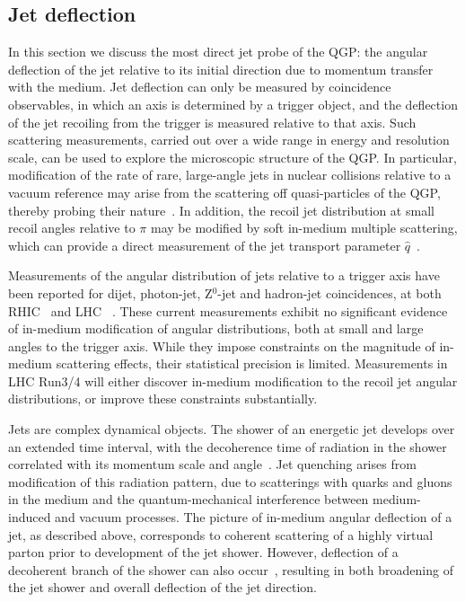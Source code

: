 \subsection{Jet deflection}

In this section we discuss the most direct jet probe of the QGP: the angular deflection of the jet relative to its initial direction due to momentum transfer with the medium. Jet deflection can only be measured by coincidence observables, in which an axis is determined by a trigger object, and the deflection of the jet recoiling from the trigger is measured relative to that axis. Such scattering measurements, carried out over a wide range in energy and resolution scale, can be used to explore the microscopic structure of the QGP. In particular, modification of the rate of rare, large-angle jets in nuclear collisions relative to a vacuum reference may arise from the scattering off quasi-particles of the QGP, thereby probing their nature~\cite{DEramo:2012uzl}. In addition, the recoil jet distribution at small recoil angles relative to $\pi$ may be modified by soft in-medium multiple scattering, which can provide a direct measurement of the jet transport parameter $\hat{q}$~\cite{Chen:2016vem}.

Measurements of the angular distribution of jets relative to a trigger axis have been reported for dijet, photon-jet, Z$^{0}$-jet and hadron-jet coincidences, at both RHIC~\cite{Adamczyk:2017yhe} and LHC ~\cite{Adam:2015doa,Sirunyan:2017jic,Sirunyan:2017qhf,Chatrchyan:2012nia,Aaboud:2017eww}. These current measurements exhibit no significant evidence of in-medium modification of angular distributions, both at small and large angles to the trigger axis. While they impose constraints on the magnitude of in-medium scattering effects, their statistical precision is limited. Measurements in LHC Run3/4 will either discover in-medium modification to the recoil jet angular distributions, or improve these constraints substantially.

Jets are complex dynamical objects. The shower of an energetic jet develops over an extended time interval, with the decoherence time of radiation in the shower correlated with its momentum scale and angle~\cite{Andrews:2018jcm}. Jet quenching arises from modification of this radiation pattern, due to scatterings with quarks and gluons in the medium and the quantum-mechanical interference between medium-induced and vacuum processes. The picture of in-medium angular deflection of a jet, as described above, corresponds to coherent scattering of a highly virtual parton prior to development of the jet shower. However, deflection of a decoherent branch of the shower can also occur~\cite{DEramo:2018eoy}, resulting in both broadening of the jet shower and overall deflection of the jet direction. 

